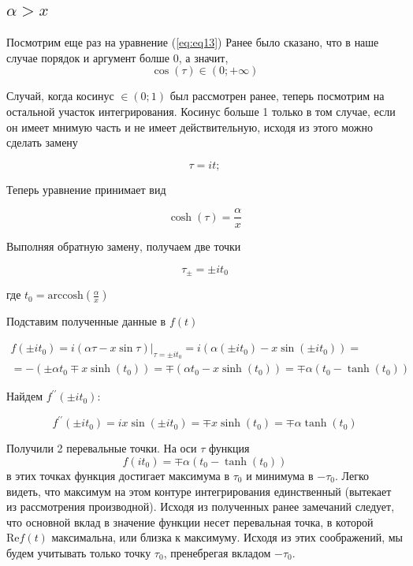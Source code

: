 \documentclass[14pt]{extarticle}
\renewcommand{\Re}{\mathrm{Re}}
\newcommand{\arccosh}{\mathrm{arccosh}}
\begin{document}
\subsection{$\alpha>x$}

Посмотрим еще раз на уравнение (\ref{eq:eq13})
Ранее было сказано, что в наше случае порядок и аргумент болше 0, а значит, 
$$
\cos(\tau) \in (0;+\infty)
$$

Случай, когда косинус $\in (0; 1)$ был рассмотрен ранее, теперь посмотрим на остальной участок интегрирования.
Косинус больше 1 только в том случае, если он имеет мнимую часть и не имеет действительную, исходя из этого можно сделать замену

$$
\tau = i t;
$$

Теперь уравнение принимает вид

$$
\cosh (\tau) = \frac{\alpha}{x}
$$

Выполняя обратную замену, получаем две точки 

$$
\tau_{\pm} = \pm i t_0
$$

где $t_0 = \arccosh \left(\frac{\alpha}{x}\right)$

Подставим полученные данные в $f(t)$

\begin{eqnarray}\nonumber 
f(\pm i t_0) = i (\alpha \tau - x \sin \tau) |_{\tau=\pm i t_0} = i (\alpha (\pm i t_0) - x \sin (\pm i t_0)) = \\
\nonumber= -(\pm \alpha t_0 \mp x \sinh(t_0)) = \mp(\alpha t_0 - x \sinh(t_0)) = \mp\alpha(t_0 - \tanh(t_0))
\end{eqnarray}

Найдем $f^{\prime \prime}(\pm i t{_0})$:

\begin{equation}\nonumber 
f^{\prime \prime}(\pm i t{_0}) = i x \sin (\pm i t_0) = \mp x \sinh (t{_0}) = \mp\alpha\tanh(t_0)
\end{equation}

Получили 2 перевальные точки. На оси $\tau$ функция 
$$
f(i t_0) = \mp \alpha (t_0 - \tanh(t_0))
$$
в этих точках функция достигает максимума в $\tau_0$ и минимума в $-\tau_0$. Легко видеть, что максимум на этом контуре интегрирования единственный (вытекает из рассмотрения производной). Исходя из полученных ранее замечаний следует, что основной вклад в значение функции несет перевальная точка, в которой $\Re f(t)$ максимальна, или близка к максимуму. Исходя из этих соображений, мы будем учитывать только точку $\tau_0$, пренебрегая вкладом $-\tau_0$.
\end{document}
